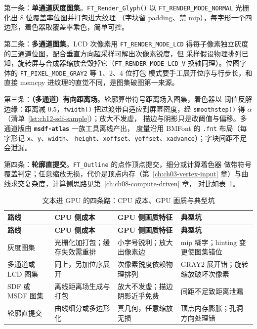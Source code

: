 \documentclass[12pt,a4paper,fontset=fandol]{ctexbook}
\newcommand{\Fn}[1]{\texttt{#1()}}
\newcommand{\Tp}[1]{\texttt{#1}}
\newcommand{\Bk}{\discretionary{}{}{}}
\newcommand{\Lib}[1]{\textbf{\texttt{#1}}}
\begin{document}
第一条：\textbf{单通道灰度图集}。\Fn{FT\_Render\_Glyph} 以
\Tp{FT\_RENDER\Bk\_MODE\Bk\_NORMAL} 光栅化出 8 位覆盖率位图并打包进大纹理
（字块留 padding、禁 mip），每字形一个四边形，着色器取覆盖率乘色，简单可控。

第二条：\textbf{多通道图集}。LCD 次像素用 \Tp{FT\_RENDER\Bk\_MODE\_LCD}
得每子像素独立灰度的三通道位图，配合垂直方向超采样可解出次像素锐度，但
采样假设物理排列已知，旋转屏与合成器缩放会毁掉它（\Tp{FT\_RENDER\Bk\_MODE\_LCD\Bk\_V}
换轴同理）。位图字体的 \Tp{FT\_PIXEL\Bk\_MODE\Bk\_GRAY2} 等 1、2、4 位打包
模式要手工展开位序与行步长，和直接 memcpy 进纹理的直觉不同，是图集破图第一来源。

第三条：\textbf{（多通道）有向距离场}。轮廓算带符号距离场入图集，着色器以
阈值反解边缘：距离减 $0.5$，\Fn{fwidth} 把过渡带自适应到屏幕密度，经
\Fn{smoothstep} 得 $\alpha$（清单~\ref{lst:ch12-sdf-sample}）；放大不发虚，
描边与阴影只是改阈值与偏移。多通道版由 \Lib{msdf-atlas} 一族工具离线产出，
度量沿用 BMFont 的 \Tp{.fnt} 布局（每字形记 \Tp{x}、\Tp{y}、\Tp{width}、
\Tp{height}、\Tp{xoffset}、\Tp{yoffset}、\Tp{xadvance}）；字块间距不足会泄漏。

第四条：\textbf{轮廓直提交}。\Tp{FT\_Outline} 的点作顶点提交，细分或计算着色器
做带符号覆盖判定；任意缩放无损，代价是顶点内存（第~\ref{ch:ch03-vertex-input}
章）与曲线求交复杂度，计算侧思路见第~\ref{ch:ch08-compute-driven} 章，
对比如表~\ref{tab:ch12-text-gpu-routes}。

\begin{longtable}{@{}>{\raggedright\arraybackslash\footnotesize}p{} >{\raggedright\arraybackslash\footnotesize}p{} >{\raggedright\arraybackslash\footnotesize}p{} >{\raggedright\arraybackslash\footnotesize}p{}@{}}
\caption{文本进 GPU 的四条路：CPU 成本、GPU 画质与典型坑}\label{tab:ch12-text-gpu-routes} \\
\toprule
\textbf{路线} & \textbf{CPU 侧成本} & \textbf{GPU 侧画质特征} & \textbf{典型坑} \\
\midrule
\endfirsthead
\toprule
\textbf{路线} & \textbf{CPU 侧成本} & \textbf{GPU 侧画质特征} & \textbf{典型坑} \\
\midrule
\endhead
\bottomrule
\endfoot
\endlastfoot
灰度图集 & 光栅化加打包；缓存失效需重排 & 小字号锐利；放大出像素边 & mip 糊字；hinting 变更使图集错位 \\
多通道或 LCD 图集 & 同上，另加位序展开 & 次像素锐度依赖物理排列 & GRAY2 展开错；旋转缩放破坏次像素 \\
SDF 或 MSDF 图集 & 离线距离场生成与打包 & 放大不发虚；描边阴影近乎免费 & 间距不足致距离泄漏 \\
轮廓直提交 & 曲线细分或多边形化 & 真几何，任意缩放无损 & 顶点内存膨胀；孔洞方向处理错 \\
\end{longtable}
\end{document}
